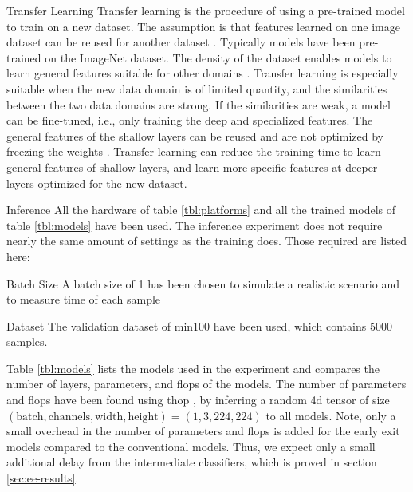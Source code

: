 \begin{enumdescript}
\begin{enumdescript}
		\item[Transfer Learning] Transfer learning is the procedure of using a pre-trained model to train on a new dataset. The assumption is that features learned on one image dataset can be reused for another dataset \cite{yosinski_how_2014}. Typically models have been pre-trained on the ImageNet dataset. The density of the dataset enables models to learn general features suitable for other domains \cite{kornblith_better_2019}. Transfer learning is especially suitable when the new data domain is of limited quantity, and the similarities between the two data domains are strong. If the similarities are weak, a model can be fine-tuned, i.e., only training the deep and specialized features. The general features of the shallow layers can be reused and are not optimized by freezing the weights \cite{li_cs231n:_2018}. Transfer learning can reduce the training time to learn general features of shallow layers, and learn more specific features at deeper layers optimized for the new dataset.
	\end{enumdescript}
	
	\item[Inference]  All the hardware of table \ref{tbl:platforms} and all the trained models of table \ref{tbl:models} have been used. The inference experiment does not require nearly the same amount of settings as the training does. Those required are listed here:
	\begin{enumdescript}
		\item[Batch Size] A batch size of 1 has been chosen to simulate a realistic scenario and to measure time of each sample
		\item[Dataset] The validation dataset of \gls{min100} have been used, which contains 5000 samples.
	\end{enumdescript} 
	
\end{enumdescript}

Table \ref{tbl:models} lists the models used in the experiment and compares the number of layers, parameters, and \acrshort{flop}s of the models. The number of parameters and \acrshort{flop}s have been found using \gls{thop} \cite{zhu_thop_nodate}, by inferring a random 4d tensor of size $ (\mathrm{batch,channels,width,height})=(1,3,224,224) $ to all models. Note, only a small overhead in the number of parameters and \acrshort{flop}s is added for the early exit models compared to the conventional models. Thus, we expect only a small additional delay from the intermediate classifiers, which is proved in section \ref{sec:ee-results}.

